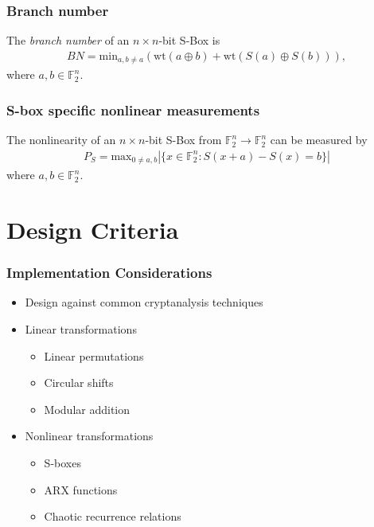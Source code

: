 \documentclass[handout]{beamer}
\newcommand{\field}[1]{\mathbb{#1}} %
\begin{document}
\begin{frame}
	\frametitle{Branch number}
	The \emph{branch number} of an $n \times n$-bit S-Box is
	\begin{eqnarray*}
		BN = \text{min}_{a, b\not=a}(\text{wt}(a \oplus b) + \text{wt}(S(a) \oplus S(b))),
	\end{eqnarray*}
	where $a, b \in \field{F}_2^n$.
\end{frame}


\begin{frame}
	\frametitle{S-box specific nonlinear measurements}
	The nonlinearity of an $n \times n$-bit S-Box from $\field{F}_2^n \to \field{F}_2^n$ can be measured by
	\begin{eqnarray*}
		P_S = \text{max}_{0 \not= a, b}|\{x \in \field{F}_2^n : S(x + a) - S(x) = b\}|
	\end{eqnarray*}
	where $a, b \in \field{F}_2^n$.
\end{frame}


\section{Design Criteria}
\begin{frame}
	\frametitle{Implementation Considerations}
	\begin{itemize}
		\item Design against common cryptanalysis techniques
		\item Linear transformations
		\begin{itemize}
			\item Linear permutations
			\item Circular shifts
			\item Modular addition
		\end{itemize}
		\item Nonlinear transformations
		\begin{itemize}
			\item S-boxes
			\item ARX functions
			\item Chaotic recurrence relations
		\end{itemize}
	\end{itemize}
\end{frame}
\end{document}
